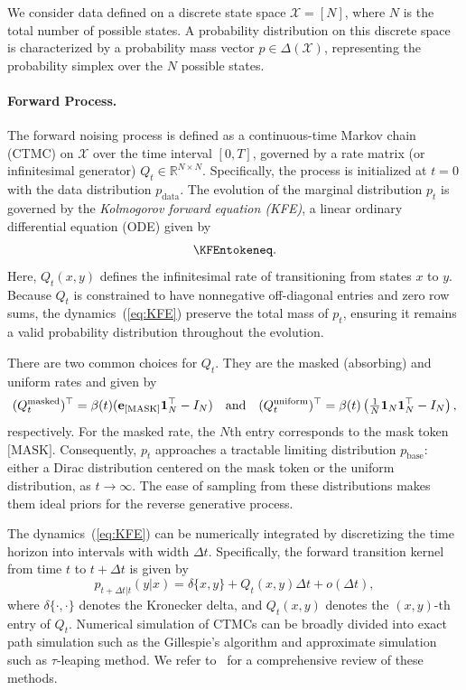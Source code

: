 \documentclass{article} %
\def\eqref#1{equation~\ref{#1}}
\newcommand{\bfe}{{\bf e}}
\newcommand{\mask}{\text{[MASK]}}
\renewcommand{\eqref}[1]{\textup{(\ref{#1})}}
\begin{document}
We consider data defined on a discrete state space $\mathcal{X} = [N]$, where $N$ is the total number of possible states. A probability distribution on this discrete space is characterized by a probability mass vector $p \in \Delta(\mathcal{X})$, representing the probability simplex over the $N$ possible states. 

\paragraph{Forward Process.} The forward noising process is defined as a continuous-time Markov chain (CTMC) on $\mathcal{X}$ over the time interval $[0, T]$, governed by a rate matrix (or infinitesimal generator) $Q_t \in \mathbb{R}^{N \times N}$. Specifically, the process is initialized at $t=0$ with the data distribution $p_{\mathrm{data}}$. The evolution of the marginal distribution $p_t$ is governed by the \emph{Kolmogorov forward equation (KFE)}, a linear ordinary differential equation (ODE) given by
\begin{equation}\label{eq:KFE}
    \KFEntokeneq.
\end{equation}
Here, $Q_t(x,y)$ defines the infinitesimal rate of transitioning from states $x$ to $y$. Because $Q_t$ is constrained to have nonnegative off-diagonal entries and zero row sums, the dynamics~\eqref{eq:KFE} preserve the total mass of $p_t$, ensuring it remains a valid probability distribution throughout the evolution. 

There are two common choices for $Q_t$. They are the masked (absorbing) and uniform rates and given by
\begin{equation}\label{eq:Q_absorb_uni_N}
(Q_t^{\rm masked})^\top = \beta(t) ( \bfe_{\mask} \mathbf{1}_N^\top - I_N) \quad \text{and} \quad (Q_t^{\rm uniform})^\top = \beta(t) \left(\tfrac{1}{N} \mathbf{1}_N \mathbf{1}_N^\top - I_N \right),
\end{equation}
respectively. For the masked rate, the $N$th entry corresponds to the mask token $\mask$. Consequently, $p_t$ approaches a tractable limiting distribution $p_{\mathrm{base}}$: either a Dirac distribution centered on the mask token or the uniform distribution, as $t \to \infty$. The ease of sampling from these distributions makes them ideal priors for the reverse generative process. 
 
The dynamics~\eqref{eq:KFE} can be numerically integrated by discretizing the time horizon into intervals with width $\Delta t$. Specifically, the forward transition kernel from time $t$ to $t +\Delta t$ is given by
\begin{equation}\label{eq:forward_kernel}
    p_{t+\Delta t| t}(y|x) = \delta\{x, y\} + Q_t(x, y) \Delta t + o(\Delta t),
\end{equation}
where $\delta\{\cdot, \cdot\}$ denotes the Kronecker delta, and $Q_t(x,y)$ denotes the $(x,y)$-th entry of $Q_t$. Numerical simulation of CTMCs can be broadly divided into exact path simulation such as the Gillespie’s algorithm and approximate simulation such as $\tau$-leaping method. We refer to~\cite{gillespie2001approximate,cao2004numerical,cao2006efficient,hobolth2009simulation,arns2010numerical} for a comprehensive review of these methods.
\end{document}
